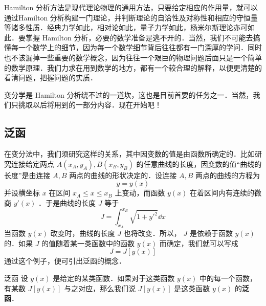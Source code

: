 
Hamilton 分析方法是现代理论物理的通用方法，只要给定相应的作用量，就可以通过Hamilton 分析构建一门理论，并判断理论的自洽性及对称性和相应的守恒量等诸多性质．经典力学如此，相对论如此，量子力学如此，杨米尔斯理论亦可如此．要掌握 Hamilton 分析，必要的数学准备是逃不开的．当然，我们不可能去搞懂每一个数学上的细节，因为每一个数学细节背后往往都有一门深厚的学问．同时也不该漏掉一些重要的数学概念，因为往往一个艰巨的物理问题后面只是一个简单的数学原理．我们力求在用到数学的地方，都有一个较合理的解释，以便更清楚的看清问题，把握问题的实质．

变分学是 Hamilton 分析绕不过的一道坎，这也是目前首要的任务之一．当然，我们只挑取以后将用到的一部分内容．现在开始吧！
\subsection{泛函}
在变分法中，我们须研究这样的关系，其中因变数的值是由函数所确定的．比如研究连接给定两点 $A(x_A,y_A),B(x_B,y_B)$ 的任意曲线的长度，因变数的值“曲线的长度”是由连接 $A,B$ 两点的曲线的形状决定的．设连接 $A,B$ 两点的曲线的方程为
\begin{equation}
y=y(x)
\end{equation}
并设横坐标 $x$ 在区间 $x_A\leq x\leq x_B$ 上变动，而函数 $y(x)$ 在着区间内有连续的微商 $y'(x)$ ．于是曲线的长度 $J$ 等于
\begin{equation}
J=\int_{x_A}^{x_B} \sqrt{1+y'^2}\dd x
\end{equation}
当函数 $y(x)$ 改变时，曲线的长度 $J$ 也将改变．所以， $J$ 是依赖于函数 $y(x)$ 的．如果 $J$ 的值随着某一类函数中的函数 $y(x)$ 而确定，我们就可以写成
\begin{equation}
J=J[y(x)]
\end{equation}
通过这个例子，便可引出泛函的概念．
\begin{definition}{泛函}
设 $y(x)$ 是给定的某类函数．如果对于这类函数 $y(x)$ 中的每一个函数，有某数 $J[y(x)]$ 与之对应，那么我们说 $J[y(x)]$ 是这类函数 $y(x)$ 的\textbf{泛函}．
\end{definition}